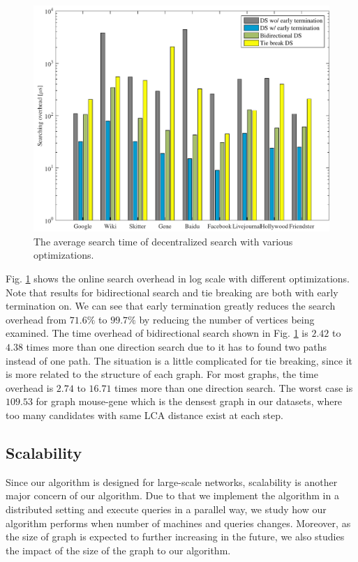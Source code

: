 \begin{figure}[t]
    \centering
    \includegraphics[width=\linewidth]{./figures/overhead_search.pdf}
    \caption{The average search time of decentralized search with various optimizations.}
    \label{fig:overhead_search}
\end{figure}

Fig. \ref{fig:overhead_search} shows the online search overhead in log scale with different optimizations. Note that results for bidirectional search and tie breaking are both with early termination on. We can see that early termination greatly reduces the search overhead from $71.6\%$ to $99.7\%$ by reducing the number of vertices being examined. The time overhead of bidirectional search shown in Fig. \ref{fig:overhead_search} is $2.42$ to $4.38$ times more than one direction search due to it has to found two paths instead of one path. The situation is a little complicated for tie breaking, since it is more related to the structure of each graph. For most graphs, the time overhead is $2.74$ to $16.71$ times more than one direction search. The worst case is $109.53$ for graph mouse-gene which is the densest graph in our datasets, where too many candidates with same LCA distance exist at each step.

\subsection{Scalability}
\label{eval_scalability}

Since our algorithm is designed for large-scale networks, scalability is another major concern of our algorithm. Due to that we implement the algorithm in a distributed setting and execute queries in a parallel way, we study how our algorithm performs when number of machines and queries changes. Moreover, as the size of graph is expected to further increasing in the future, we also studies the impact of the size of the graph to our algorithm.

